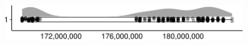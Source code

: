 \documentclass[
]{article}
\begin{document}
\begin{minipage}[t]{0.3\linewidth}

~

\end{minipage}%
\begin{minipage}[t]{0.7\linewidth}

\includegraphics[width=396px]{codebook_template_files/figure-latex/submission_id_rainplot-1}

\end{minipage}
 \vspace*{-5mm} 

\begin{minipage}[t]{0.3\linewidth}

~

\end{minipage}%
\begin{minipage}[t]{0.7\linewidth}

~

\end{minipage}
 \vspace*{-7mm} 
\end{document}

